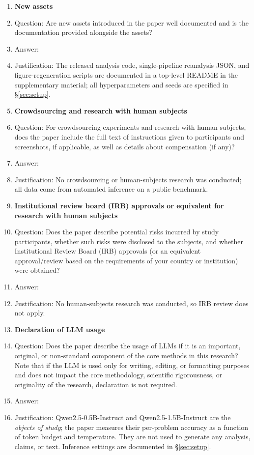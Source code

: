 \documentclass{article}
\begin{document}
\begin{enumerate}
\item {\bf New assets}
    \item[] Question: Are new assets introduced in the paper well documented and is the documentation provided alongside the assets?
    \item[] Answer: \answerYes{}
    \item[] Justification: The released analysis code, single-pipeline reanalysis JSON, and figure-regeneration scripts are documented in a top-level README in the supplementary material; all hyperparameters and seeds are specified in \S\ref{sec:setup}.

\item {\bf Crowdsourcing and research with human subjects}
    \item[] Question: For crowdsourcing experiments and research with human subjects, does the paper include the full text of instructions given to participants and screenshots, if applicable, as well as details about compensation (if any)?
    \item[] Answer: \answerNA{}
    \item[] Justification: No crowdsourcing or human-subjects research was conducted; all data come from automated inference on a public benchmark.

\item {\bf Institutional review board (IRB) approvals or equivalent for research with human subjects}
    \item[] Question: Does the paper describe potential risks incurred by study participants, whether such risks were disclosed to the subjects, and whether Institutional Review Board (IRB) approvals (or an equivalent approval/review based on the requirements of your country or institution) were obtained?
    \item[] Answer: \answerNA{}
    \item[] Justification: No human-subjects research was conducted, so IRB review does not apply.

\item {\bf Declaration of LLM usage}
    \item[] Question: Does the paper describe the usage of LLMs if it is an important, original, or non-standard component of the core methods in this research? Note that if the LLM is used only for writing, editing, or formatting purposes and does not impact the core methodology, scientific rigorousness, or originality of the research, declaration is not required.
    \item[] Answer: \answerYes{}
    \item[] Justification: Qwen2.5-0.5B-Instruct and Qwen2.5-1.5B-Instruct are the \emph{objects of study}; the paper measures their per-problem accuracy as a function of token budget and temperature. They are not used to generate any analysis, claims, or text. Inference settings are documented in \S\ref{sec:setup}.

\end{enumerate}
\end{document}
